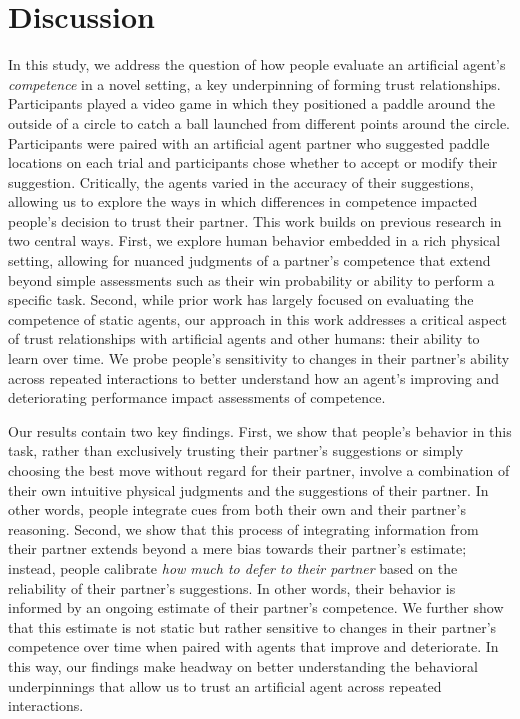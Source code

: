 \documentclass[10pt,letterpaper]{article}
\begin{document}
\section{Discussion}
In this study, we address the question of how people evaluate an artificial agent's \textit{competence} in a novel setting, a key underpinning of forming trust relationships. Participants played a video game in which they positioned a paddle around the outside of a circle to catch a ball launched from different points around the circle. Participants were paired with an artificial agent partner who suggested paddle locations on each trial and participants chose whether to accept or modify their suggestion. Critically, the agents varied in the accuracy of their suggestions, allowing us to explore the ways in which differences in competence impacted people's decision to trust their partner. This work builds on previous research in two central ways. First, we explore human behavior embedded in a rich physical setting, allowing for nuanced judgments of a partner's competence that extend beyond simple assessments such as their win probability or ability to perform a specific task. Second, while prior work has largely focused on evaluating the competence of static agents, our approach in this work addresses a critical aspect of trust relationships with artificial agents and other humans: their ability to learn over time. We probe people's sensitivity to changes in their partner's ability across repeated interactions to better understand how an agent's improving and deteriorating performance impact assessments of competence. 

Our results contain two key findings. First, we show that people's behavior in this task, rather than exclusively trusting their partner's suggestions or simply choosing the best move without regard for their partner, involve a combination of their own intuitive physical judgments and the suggestions of their partner. In other words, people integrate cues from both their own and their partner's reasoning. Second, we show that this process of integrating information from their partner extends beyond a mere bias towards their partner's estimate; instead, people calibrate \textit{how much to defer to their partner} based on the reliability of their partner's suggestions. In other words, their behavior is informed by an ongoing estimate of their partner's competence. We further show that this estimate is not static but rather sensitive to changes in their partner's competence over time when paired with agents that improve and deteriorate. In this way, our findings make headway on better understanding the behavioral underpinnings that allow us to trust an artificial agent across repeated interactions. 
\end{document}
